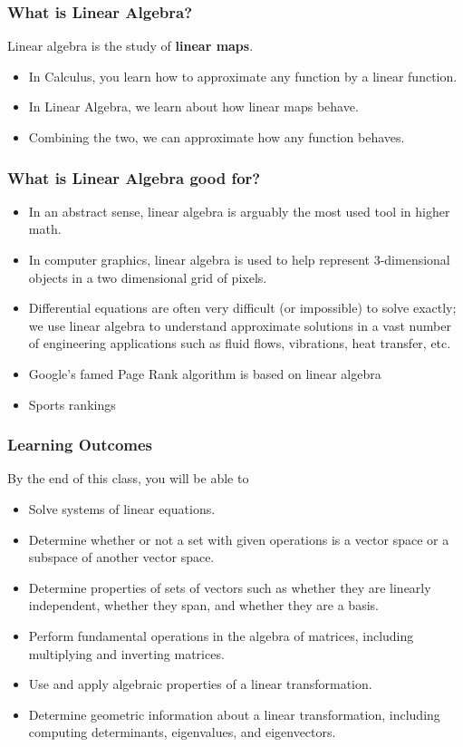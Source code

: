 \documentclass[aspectration=1610]{beamer}
\begin{document}
\begin{frame} \frametitle{What is Linear Algebra? }
Linear algebra is the study of {\bf linear maps}.
\begin{itemize}
\item In Calculus, you learn how to approximate any function by a linear function.
\item In Linear Algebra, we learn about how linear maps behave.
\item Combining the two, we can approximate how any function behaves.
\end{itemize}
\end{frame}

\begin{frame} \frametitle{What is Linear Algebra good for?}
\begin{itemize}
\item In an abstract sense, linear algebra is arguably the most used tool in higher math.
\item In computer graphics, linear algebra is used to help represent 3-dimensional objects in a two dimensional grid of pixels.
\item Differential equations are often very difficult (or impossible) to solve exactly; we use linear algebra to understand approximate solutions in a vast number of engineering applications such as fluid flows, vibrations, heat transfer, etc.
\item Google's famed Page Rank algorithm is based on linear algebra
\item Sports rankings 
\end{itemize}
\end{frame}

\begin{frame} \frametitle{Learning Outcomes }
By the end of this class, you will be able to
\begin{itemize}
\item Solve systems of linear equations.
\pause \item Determine whether or not a set with given operations is a vector space or a subspace of another vector space.
\pause \item Determine properties of sets of vectors such as whether they are linearly independent, whether they span, and whether they are a basis.
\pause \item Perform fundamental operations in the algebra of matrices, including multiplying and inverting matrices.
\pause \item Use and apply algebraic properties of a linear transformation.
\pause \item Determine geometric information about a linear transformation, including computing determinants, eigenvalues, and eigenvectors.
\end{itemize}
\end{frame}
\end{document}

